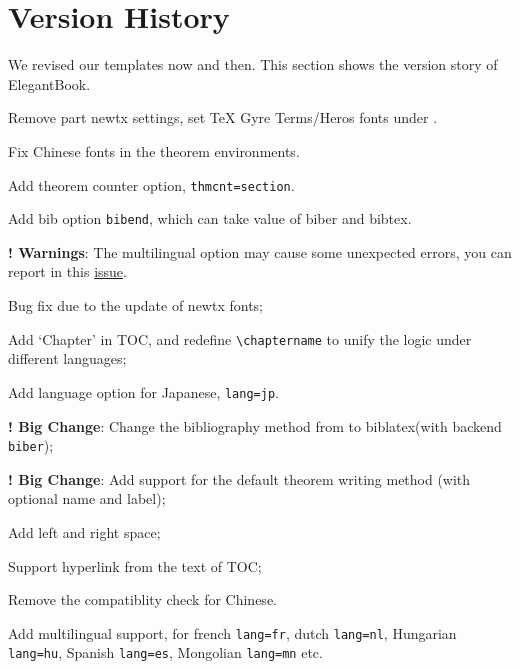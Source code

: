 
\chapter{Version History}
We revised our templates now and then. This section shows the version story of ElegantBook.



\begin{change}
  \item Remove part newtx settings, set TeX Gyre Terms/Heros fonts under .
  \item Fix Chinese fonts in the theorem environments.
  \item Add theorem counter option, \lstinline{thmcnt=section}.
  \item Add bib option \lstinline{bibend}, which can take value of biber and bibtex.
  \item \textbf{! Warnings}: The multilingual option may cause some unexpected errors, you can report in this \href{https://github.com/ElegantLaTeX/ElegantBook/issues/170}{issue}.
\end{change}




\begin{change}
  \item Bug fix due to the update of newtx fonts;
  \item Add `Chapter' in TOC, and redefine \lstinline{\chaptername} to unify the logic under different languages;
  \item Add language option for Japanese, \lstinline{lang=jp}.
\end{change}



\begin{change}
  \item \textbf{! Big Change}: Change the bibliography method from  to biblatex(with backend  \lstinline{biber});
  \item \textbf{! Big Change}: Add support for the default theorem writing method (with optional name and label);
  \item Add left and right space;
  \item Support hyperlink from the text of TOC;
  \item Remove the  compatiblity check for Chinese.
  \item Add multilingual support, for french \lstinline{lang=fr}, dutch \lstinline{lang=nl}, Hungarian  \lstinline{lang=hu}, Spanish \lstinline{lang=es}, Mongolian \lstinline{lang=mn} etc.
\end{change}

